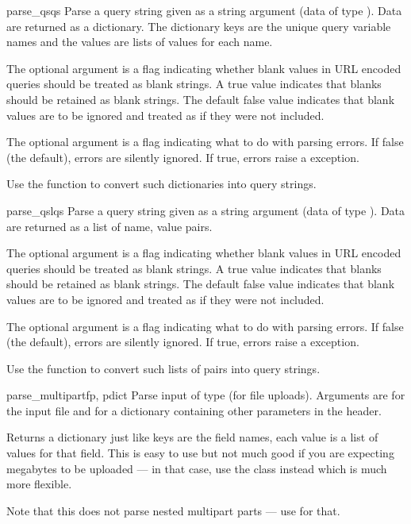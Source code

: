 \begin{funcdesc}{parse_qs}{qs}
Parse a query string given as a string argument (data of type 
).  Data are
returned as a dictionary.  The dictionary keys are the unique query
variable names and the values are lists of values for each name.

The optional argument  is
a flag indicating whether blank values in
URL encoded queries should be treated as blank strings.  
A true value indicates that blanks should be retained as 
blank strings.  The default false value indicates that
blank values are to be ignored and treated as if they were
not included.

The optional argument  is a flag indicating what
to do with parsing errors.  If false (the default), errors
are silently ignored.  If true, errors raise a 
exception.

Use the  function to convert
such dictionaries into query strings.

\end{funcdesc}

\begin{funcdesc}{parse_qsl}{qs}
Parse a query string given as a string argument (data of type 
).  Data are
returned as a list of name, value pairs.

The optional argument  is
a flag indicating whether blank values in
URL encoded queries should be treated as blank strings.  
A true value indicates that blanks should be retained as 
blank strings.  The default false value indicates that
blank values are to be ignored and treated as if they were
not included.

The optional argument  is a flag indicating what
to do with parsing errors.  If false (the default), errors
are silently ignored.  If true, errors raise a 
exception.

Use the  function to convert
such lists of pairs into query strings.
\end{funcdesc}

\begin{funcdesc}{parse_multipart}{fp, pdict}
Parse input of type  (for 
file uploads).  Arguments are  for the input file and
 for a dictionary containing other parameters in
the  header.

Returns a dictionary just like  keys are the
field names, each value is a list of values for that field.  This is
easy to use but not much good if you are expecting megabytes to be
uploaded --- in that case, use the  class instead
which is much more flexible.

Note that this does not parse nested multipart parts --- use
 for that.
\end{funcdesc}

